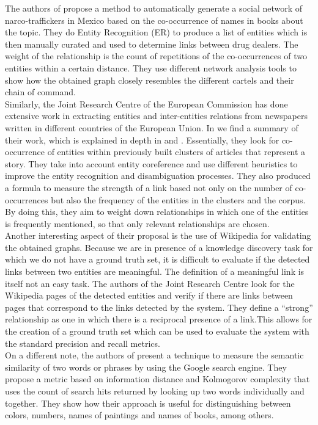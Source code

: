 The authors of \cite{narcho-networks} propose a method to automatically generate a social network of narco-traffickers in Mexico based on the co-occurrence of names in books about the topic. They do Entity Recognition (ER) to produce a list of entities which is then manually curated and used to determine links between drug dealers. The weight of the relationship is the count of repetitions of the co-occurrences of two entities within a certain distance. They use different network analysis tools to show how the obtained graph closely resembles the different cartels and their chain of command. \\

Similarly, the Joint Research Centre of the European Commission has done extensive work in extracting entities and inter-entities relations from newspapers written in different countries of the European Union. In \cite{jrc-main} we find a summary of their work, which is explained in depth in \cite{jrc-2} and \cite{jrc-3}. Essentially, they look for co-occurrence of entities within previously built clusters of articles that represent a story. They take into account entity coreference and use different heuristics to improve the entity recognition and disambiguation processes. They also produced a formula to measure the strength of a link based not only on the number of co-occurrences but also the frequency of the entities in the clusters and the corpus. By doing this, they aim to weight down relationships in which one of the entities is frequently mentioned, so that only relevant relationships are chosen. \\

Another interesting aspect of their proposal is the use of Wikipedia for validating the obtained graphs. Because we are in presence of a knowledge discovery task for which we do not have a ground truth set, it is difficult to evaluate if the detected links between two entities are meaningful. The definition of a meaningful link is itself not an easy task. The authors of the Joint Research Centre look for the Wikipedia pages of the detected entities and verify if there are links between pages that correspond to the links detected by the system. They define a ``strong'' relationship as one in which there is a reciprocal presence of a link.This allows for the creation of a ground truth set which can be used to evaluate the system with the standard precision and recall metrics. \\

On a different note, the authors of  \cite{google-similarity-measure} present a technique to measure the semantic similarity of two words or phrases by using the Google search engine. They propose a metric based on information distance and Kolmogorov complexity that uses the count of search hits returned by looking up two words individually and together. They show how their approach is useful for distinguishing between colors, numbers, names of paintings and names of books, among others. \\

